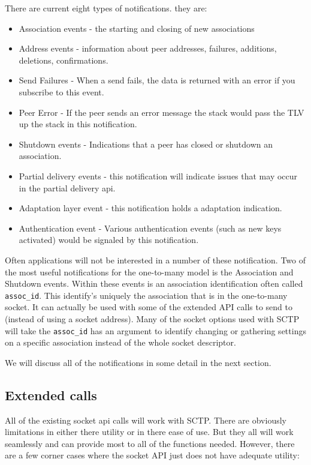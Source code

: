 \documentclass[conference]{IEEEtran}
\begin{document}
There are current eight types of notifications. they are:
\begin{itemize}
 \item  Association events - the starting and closing of new associations
 \item  Address events - information about peer addresses, failures, additions, deletions, confirmations.
 \item  Send Failures - When a send fails, the data is returned with an error if you subscribe to this event.
 \item  Peer Error - If the peer sends an error message the stack would pass the TLV up the stack in this notification.
 \item  Shutdown events - Indications that a peer has closed or shutdown an association.
 \item  Partial delivery events - this notification will indicate issues that may occur in the partial delivery api.
 \item  Adaptation layer event - this notification holds a adaptation indication.
 \item  Authentication event - Various authentication events (such as new keys activated) would be signaled by this notification.
 \end{itemize}

Often applications will not be interested in a number of these notification. Two of the most
useful notifications for the one-to-many model is the Association and Shutdown events. Within
these events is an association identification often called \texttt{assoc\_id}. This identify's uniquely the
association that is in the one-to-many socket. It can actually be used with some of the extended
API calls to send to (instead of using a socket address).  Many of the socket options used with
SCTP will take the \texttt{assoc\_id} has an argument to identify changing or gathering settings on
a specific association instead of the whole socket descriptor.

We will discuss all of the notifications in some detail in the next section.

\subsection{Extended calls}

All of the existing socket api calls will work with SCTP. There are
obviously limitations in either there utility or in there ease of use.
But they all will work seamlessly and can provide most to all of
the functions needed. However, there are a few corner cases
where the socket API just does not have adequate utility:
\end{document}
